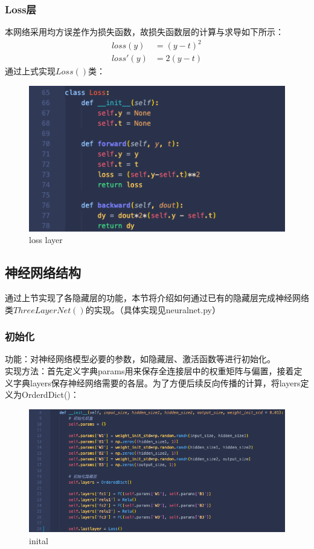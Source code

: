 \documentclass{article}
\begin{document}
\subsubsection{Loss层}
本网络采用均方误差作为损失函数，故损失函数层的计算与求导如下所示：
\begin{equation}
	\begin{aligned}
		loss(y) &=  (y-t)^2\\
		loss'(y) &= 2(y-t)
	\end{aligned}
\end{equation}
通过上式实现$ Loss() $类：
\begin{figure}[H]
	\centering
	\includegraphics{losslayer.png}
	\caption{loss layer}
\end{figure}

\subsection{神经网络结构}
通过上节实现了各隐藏层的功能，本节将介绍如何通过已有的隐藏层完成神经网络类$ ThreeLayerNet() $的实现。（具体实现见neuralnet.py）

\subsubsection{初始化}
功能：对神经网络模型必要的参数，如隐藏层、激活函数等进行初始化。\\
实现方法：首先定义字典params用来保存全连接层中的权重矩阵与偏置，接着定义字典layers保存神经网络需要的各层。为了方便后续反向传播的计算，将layers定义为OrderdDict()：
\begin{figure}[H]
	\centering
	\includegraphics[scale=0.6]{init.png}
	\caption{inital}
\end{figure}
\end{document}

